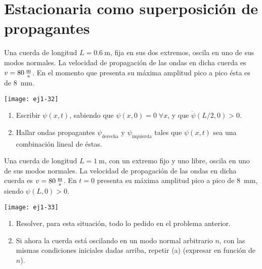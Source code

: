 \section*{Estacionaria como superposición de propagantes}

\item 
\begin{minipage}[t][2cm]{0.6\textwidth}
Una cuerda de longitud $L = \SI{0.6}{\metre}$, fija en sus dos extremos, oscila en uno de sus modos normales.
La velocidad de propagación de las ondas en dicha cuerda es \(v = \SI{80}{\metre\over\second}\).
En el momento que presenta su máxima amplitud pico a pico ésta es de \SI{8}{\milli\metre}.
\end{minipage}
\begin{minipage}[c][0.8cm][t]{0.34\textwidth}
	\texttt{[image: ej1-32]}
\end{minipage}
\begin{enumerate}
	\item Escribir $\psi(x,t)$, sabiendo que $\psi(x,0) = 0\;\forall x$, y que $\dot{\psi}(L/2,0) > 0$.
	\item Hallar ondas propagantes $\psi_\mathrm{derecha}$ y \(\psi_\mathrm{izquierda}\) tales que $\psi(x,t)$ sea una combinación lineal de éstas. 
\end{enumerate}


\item 
\begin{minipage}[t][2.5cm]{0.6\textwidth}
Una cuerda de longitud $L = \SI{1}{\metre}$, con un extremo fijo y uno libre, oscila en uno de sus modos normales.
La velocidad de propagación de las ondas en dicha cuerda es \(v= \SI{80}{\metre\over\second}\).
En \(t = 0\) presenta su máxima amplitud pico a pico de \SI{8}{\milli\metre}, siendo $\psi(L,0) > 0$.
\end{minipage}
\begin{minipage}[c][0.2cm][t]{0.34\textwidth}
	\texttt{[image: ej1-33]}
\end{minipage}
\begin{enumerate}
	\item Resolver, para esta situación, todo lo pedido en el problema anterior. 
	\item Si ahora la cuerda está oscilando en un modo normal arbitrario $n$, con las mismas condiciones iniciales dadas arriba, repetir (a) (expresar en función de $n$).
\end{enumerate}
